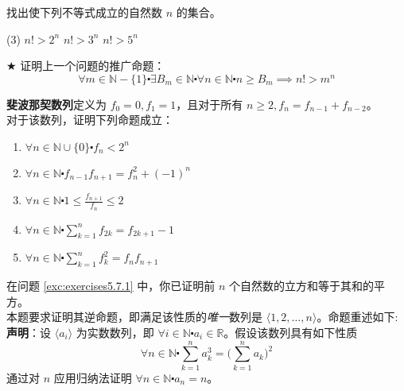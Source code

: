 \begin{exercise}
    找出使下列不等式成立的自然数 $n$ 的集合。
    \begin{tasks}[label=(\alph*)](3)
        \task $n! > 2^n$
        \task $n! > 3^n$
        \task $n! > 5^n$
    \end{tasks}
\end{exercise}

\begin{exercise}
    $\bigstar$ 证明上一个问题的推广命题：
    \[\forall m \in \mathbb{N} - \{1\} \centerdot \exists B_m \in \mathbb{N} \centerdot \forall n \in \mathbb{N} \centerdot n \ge B_m \implies n! > m^n\]
\end{exercise}

\begin{exercise}
    \textbf{斐波那契数列}定义为 $f_0=0, f_1=1$，且对于所有 $n \ge 2, f_n = f_{n-1}+f_{n-2}$。\\
    对于该数列，证明下列命题成立：
    \begin{enumerate}[label=(\alph*)]
        \item $\displaystyle \forall n \in \mathbb{N} \cup \{0\} \centerdot f_n < 2^n$
        \item $\displaystyle \forall n \in \mathbb{N} \centerdot f_{n-1}f_{n+1} = f_n^2+(-1)^n$
        \item $\displaystyle \forall n \in \mathbb{N} \centerdot 1 \le \frac{f_{n+1}}{f_n} \le 2$
        \item $\displaystyle \forall n \in \mathbb{N} \centerdot \sum_{k=1}^{n} f_{2k}= f_{2k+1}-1$
        \item $\displaystyle \forall n \in \mathbb{N} \centerdot \sum_{k=1}^{n} f_k^2= f_{n}f_{n+1}$
    \end{enumerate}
\end{exercise}

\begin{exercise}\label{exc:exercises5.7.15}
    在问题 \ref{exc:exercises5.7.1} 中，你已证明前 $n$ 个自然数的立方和等于其和的平方。\\
    本题要求证明其逆命题，即满足该性质的\emph{唯一}数列是 $\langle 1, 2, \dots, n \rangle$。命题重述如下:\\
    \textbf{声明}：设 $\langle a_i \rangle$ 为实数数列，即 $\forall i \in \mathbb{N} \centerdot a_i \in \mathbb{R}$。假设该数列具有如下性质
    \[\forall n \in \mathbb{N} \centerdot \sum_{k=1}^{n} a_k^3 = \bigg(\sum_{k=1}^{n} a_k\bigg)^2\]
    通过对 $n$ 应用归纳法证明 $\forall n \in \mathbb{N} \centerdot a_n = n$。
\end{exercise}

